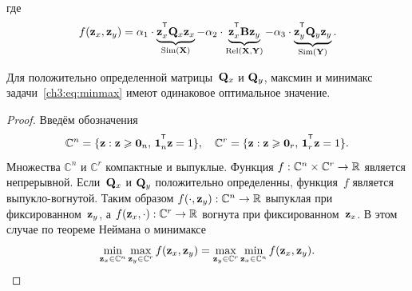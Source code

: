 где
\begin{equation*}
	f(\bz_x, \bz_y) = \alpha_1 \cdot \underbrace{\bz_x^{\T} \bQ_x \bz_x}_{\text{Sim}(\bX)} - \alpha_2 \cdot \underbrace{\bz_x^{\T} \bB \bz_y}_{\text{Rel}(\bX, \bY)} - \alpha_3 \cdot \underbrace{\bz_y^{\T} \bQ_y \bz_y}_{\text{Sim}(\bY)}.
\end{equation*}
\begin{theorem}
	Для положительно определенной матрицы~$\mathbf{Q}_x$ и $\mathbf{Q}_y$, максмин и минимакс задачи~\eqref{ch3:eq:minmax} имеют одинаковое оптимальное значение.
\end{theorem}
\begin{proof}
	Введём обозначения
	\begin{equation*}
		\mathbb{C}^n = \{\bz : \bz \geq \bZero_n, \, \bOne_n^{\T}\bz=1\}, \quad \mathbb{C}^r = \{\bz : \bz \geq \bZero_r, \, \bOne_r^{\T}\bz=1\}.
	\end{equation*}
	Множества $\mathbb{C}^n$ и $\mathbb{C}^r$ компактные и выпуклые. Функция $f: \mathbb{C}^n \times \mathbb{C}^r \rightarrow \mathbb{R}$ является непрерывной. Если~$\mathbf{Q}_x$ и $\mathbf{Q}_y$ положительно определенны, функция~$f$ является выпукло-вогнутой. Таким образом
	$f(\cdot, \mathbf{z}_y): \mathbb{C}^n \rightarrow \mathbb{R}$ выпуклая при фиксированном~$\mathbf{z}_y$, а $f(\mathbf{z}_x, \cdot): \mathbb{C}^r \rightarrow \mathbb{R}$ вогнута при фиксированном~$\mathbf{z}_x$.
	В этом случае по теореме Неймана о минимаксе
	\begin{equation*}
		\min_{\mathbf{z}_x \in \mathbb{C}^n} \max_{\mathbf{z}_y \in \mathbb{C}^r} f(\mathbf{z}_x, \mathbf{z}_y) = \max_{\mathbf{z}_y \in \mathbb{C}^r} \min_{\mathbf{z}_x\in \mathbb{C}^n} f(\mathbf{z}_x, \mathbf{z}_y).
	\end{equation*}
\end{proof}

